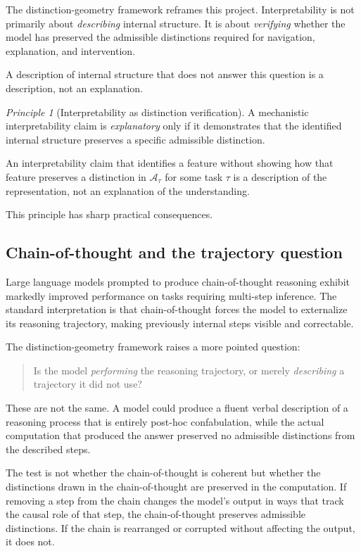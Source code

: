 \documentclass[11pt, a4paper]{article}
\theoremstyle{plain}
\theoremstyle{definition}
\theoremstyle{remark}
\newtheorem{principle}[theorem]{Principle}
\newcommand{\Adm}{\mathcal{A}}
\begin{document}
The distinction-geometry framework reframes this project.
Interpretability is not primarily about \emph{describing}
internal structure. It is about \emph{verifying} whether the
model has preserved the admissible distinctions required for
navigation, explanation, and intervention.

A description of internal structure that does not answer this
question is a description, not an explanation.

\begin{principle}[Interpretability as distinction verification]
\label{prin:interp}
A mechanistic interpretability claim is \emph{explanatory}
only if it demonstrates that the identified internal structure
preserves a specific admissible distinction.

An interpretability claim that identifies a feature without
showing how that feature preserves a distinction in
$\Adm_\tau$ for some task $\tau$ is a description of the
representation, not an explanation of the understanding.
\end{principle}

This principle has sharp practical consequences.

\subsection{Chain-of-thought and the trajectory question}

Large language models prompted to produce chain-of-thought
reasoning exhibit markedly improved performance on tasks
requiring multi-step inference. The standard interpretation
is that chain-of-thought forces the model to externalize
its reasoning trajectory, making previously internal steps
visible and correctable.

The distinction-geometry framework raises a more pointed question:

\begin{quote}
Is the model \emph{performing} the reasoning trajectory,
or merely \emph{describing} a trajectory it did not use?
\end{quote}

These are not the same. A model could produce a fluent verbal
description of a reasoning process that is entirely post-hoc
confabulation, while the actual computation that produced the
answer preserved no admissible distinctions from the described
steps.

The test is not whether the chain-of-thought is coherent but
whether the distinctions drawn in the chain-of-thought
are preserved in the computation. If removing a step from the
chain changes the model's output in ways that track the causal
role of that step, the chain-of-thought preserves admissible
distinctions. If the chain is rearranged or corrupted without
affecting the output, it does not.
\end{document}
